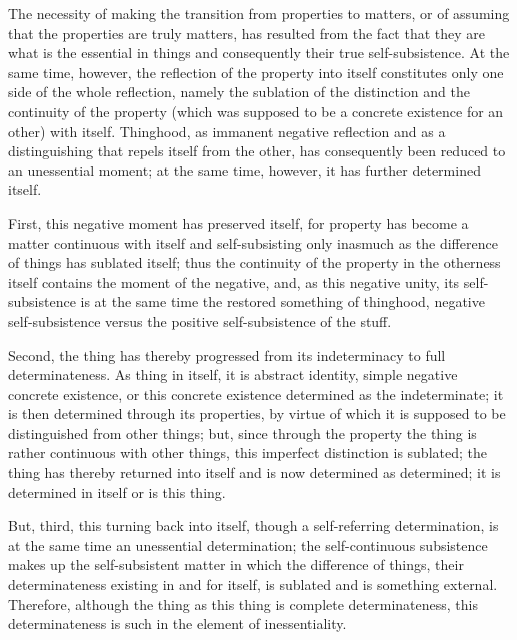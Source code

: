 The necessity of making the transition
from properties to matters,
or of assuming that the properties are truly matters,
has resulted from the fact that they are
what is the essential in things
and consequently their true self-subsistence.
At the same time, however, 
the reflection of the property into itself 
constitutes only one side of the whole reflection,
namely the sublation of the distinction
and the continuity of the property
(which was supposed to be a concrete existence for an other)
with itself.
Thinghood, as immanent negative reflection 
and as a distinguishing that repels itself from the other,
has consequently been reduced to an unessential moment;
at the same time, however, it has further determined itself.

First, this negative moment has preserved itself,
for property has become a matter continuous with itself
and self-subsisting only inasmuch as the difference
of things has sublated itself;
thus the continuity of the property in the otherness
itself contains the moment of the negative,
and, as this negative unity, its self-subsistence is at the same time
the restored something of thinghood, negative self-subsistence
versus the positive self-subsistence of the stuff.

Second, the thing has thereby progressed
from its indeterminacy to full determinateness.
As thing in itself, it is abstract identity,
simple negative concrete existence,
or this concrete existence determined as the indeterminate;
it is then determined through its properties,
by virtue of which it is supposed to be
distinguished from other things;
but, since through the property the thing is
rather continuous with other things,
this imperfect distinction is sublated;
the thing has thereby returned into itself
and is now determined as determined;
it is determined in itself or is this thing.

But, third, this turning back into itself,
though a self-referring determination,
is at the same time an unessential determination;
the self-continuous subsistence makes up
the self-subsistent matter in which the difference of things,
their determinateness existing in and for itself,
is sublated and is something external.
Therefore, although the thing as this thing
is complete determinateness, this determinateness is such
in the element of inessentiality.

